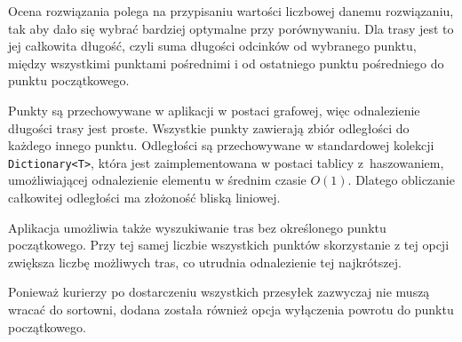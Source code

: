 Ocena rozwiązania polega na przypisaniu wartości liczbowej danemu rozwiązaniu, tak aby dało się wybrać bardziej optymalne przy porównywaniu. Dla trasy jest to jej całkowita długość, czyli suma długości odcinków od wybranego punktu, między wszystkimi punktami pośrednimi i od ostatniego punktu pośredniego do punktu początkowego.

Punkty są przechowywane w aplikacji w postaci grafowej, więc odnalezienie długości trasy jest proste. Wszystkie punkty zawierają zbiór odległości do każdego innego punktu. Odległości są przechowywane w standardowej kolekcji \texttt{Dictionary<T>}, która jest zaimplementowana w postaci tablicy z~haszowaniem, umożliwiającej odnalezienie elementu w średnim czasie $O(1)$. Dlatego obliczanie całkowitej odległości ma złożoność bliską liniowej.

Aplikacja umożliwia także wyszukiwanie tras bez określonego punktu początkowego. Przy tej samej liczbie wszystkich punktów skorzystanie z tej opcji zwiększa liczbę możliwych tras, co utrudnia odnalezienie tej najkrótszej. 

Ponieważ kurierzy po dostarczeniu wszystkich przesyłek zazwyczaj nie muszą wracać do sortowni, dodana została również opcja wyłączenia powrotu do punktu początkowego. 